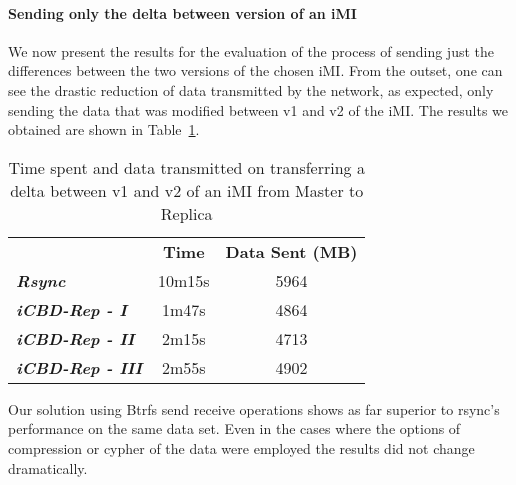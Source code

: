 
\paragraph{Sending only the delta between version of an iMI}
\label{par:eval_iMI_delta}

We now present the results for the evaluation of the process of sending just the differences between the two versions of the chosen iMI. From the outset, one can see the drastic reduction of data transmitted by the network, as expected, only sending the data that was modified between v1 and v2 of the iMI. The results we obtained are shown in Table~\ref{tab:eval_imidelta}.

\begin{table}[h]
\centering
\begin{tabular}{lcc}
 & \textbf{Time} & \textbf{Data Sent (MB)} \\ \cline{2-3} 
\textit{\textbf{Rsync}} & 10m15s & 5964 \\
\textit{\textbf{iCBD-Rep - I}} & 1m47s & 4864 \\
\textit{\textbf{iCBD-Rep - II}} & 2m15s & 4713 \\
\textit{\textbf{iCBD-Rep - III}} & 2m55s & 4902
\end{tabular}
\caption{Time spent and data transmitted on transferring a delta between v1 and v2 of an iMI from Master to Replica}
\label{tab:eval_imidelta}
\end{table}

Our solution using Btrfs send \/ receive operations shows as far superior to rsync's performance on the same data set. Even in the cases where the options of compression or cypher of the data were employed the results did not change dramatically.



